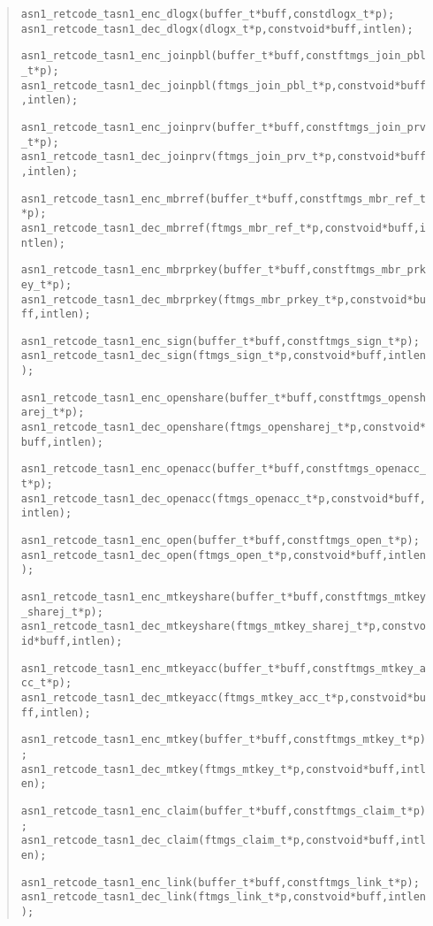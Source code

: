 \documentclass[a4paper]{article}
\newenvironment{code}%
{\begin{quote}\footnotesize\begin{alltt}}%
{\end{alltt}\end{quote}}%
\begin{document}
\begin{code}
asn1_retcode_t asn1_enc_dlogx(buffer_t* buff, const dlogx_t* p);
asn1_retcode_t asn1_dec_dlogx(dlogx_t* p, const void* buff, int len);

asn1_retcode_t asn1_enc_joinpbl(buffer_t* buff, const ftmgs_join_pbl_t* p);
asn1_retcode_t asn1_dec_joinpbl(ftmgs_join_pbl_t* p, const void* buff, int len);

asn1_retcode_t asn1_enc_joinprv(buffer_t* buff, const ftmgs_join_prv_t* p);
asn1_retcode_t asn1_dec_joinprv(ftmgs_join_prv_t* p, const void* buff, int len);

asn1_retcode_t asn1_enc_mbrref(buffer_t* buff, const ftmgs_mbr_ref_t* p);
asn1_retcode_t asn1_dec_mbrref(ftmgs_mbr_ref_t* p, const void* buff, int len);

asn1_retcode_t asn1_enc_mbrprkey(buffer_t* buff, const ftmgs_mbr_prkey_t* p);
asn1_retcode_t asn1_dec_mbrprkey(ftmgs_mbr_prkey_t* p, const void* buff, int len);

asn1_retcode_t asn1_enc_sign(buffer_t* buff, const ftmgs_sign_t* p);
asn1_retcode_t asn1_dec_sign(ftmgs_sign_t* p, const void* buff, int len);

asn1_retcode_t asn1_enc_openshare(buffer_t* buff, const ftmgs_opensharej_t* p);
asn1_retcode_t asn1_dec_openshare(ftmgs_opensharej_t* p, const void* buff, int len);

asn1_retcode_t asn1_enc_openacc(buffer_t* buff, const ftmgs_openacc_t* p);
asn1_retcode_t asn1_dec_openacc(ftmgs_openacc_t* p, const void* buff, int len);

asn1_retcode_t asn1_enc_open(buffer_t* buff, const ftmgs_open_t* p);
asn1_retcode_t asn1_dec_open(ftmgs_open_t* p, const void* buff, int len);

asn1_retcode_t asn1_enc_mtkeyshare(buffer_t* buff, const ftmgs_mtkey_sharej_t* p);
asn1_retcode_t asn1_dec_mtkeyshare(ftmgs_mtkey_sharej_t* p, const void* buff, int len);

asn1_retcode_t asn1_enc_mtkeyacc(buffer_t* buff, const ftmgs_mtkey_acc_t* p);
asn1_retcode_t asn1_dec_mtkeyacc(ftmgs_mtkey_acc_t* p, const void* buff, int len);

asn1_retcode_t asn1_enc_mtkey(buffer_t* buff, const ftmgs_mtkey_t* p);
asn1_retcode_t asn1_dec_mtkey(ftmgs_mtkey_t* p, const void* buff, int len);

asn1_retcode_t asn1_enc_claim(buffer_t* buff, const ftmgs_claim_t* p);
asn1_retcode_t asn1_dec_claim(ftmgs_claim_t* p, const void* buff, int len);

asn1_retcode_t asn1_enc_link(buffer_t* buff, const ftmgs_link_t* p);
asn1_retcode_t asn1_dec_link(ftmgs_link_t* p, const void* buff, int len);
\end{code}
\end{document}
